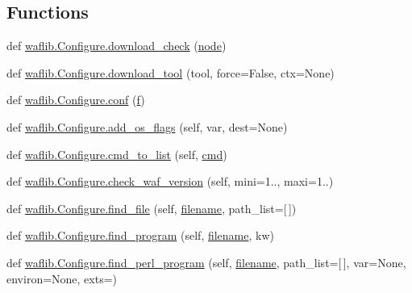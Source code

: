 \subsection*{Functions}
\begin{DoxyCompactItemize}
\item 
def \hyperlink{namespacewaflib_1_1_configure_a1e210b32a9fe3198b2a5d76f52b71217}{waflib.\+Configure.\+download\+\_\+check} (\hyperlink{structnode}{node})
\item 
def \hyperlink{namespacewaflib_1_1_configure_ad86a4a669e19d713f08512e871f3540a}{waflib.\+Configure.\+download\+\_\+tool} (tool, force=False, ctx=None)
\item 
def \hyperlink{namespacewaflib_1_1_configure_a41868904e34bb408566bcebd257f6a47}{waflib.\+Configure.\+conf} (\hyperlink{checksum_8c_ae747d72a1a803f5ff4a4b2602857d93b}{f})
\item 
def \hyperlink{namespacewaflib_1_1_configure_a8ab41e4f525735f1037b3f8af1136a04}{waflib.\+Configure.\+add\+\_\+os\+\_\+flags} (self, var, dest=None)
\item 
def \hyperlink{namespacewaflib_1_1_configure_ad63c4b95b4ee0e19c9277b62a01f4d08}{waflib.\+Configure.\+cmd\+\_\+to\+\_\+list} (self, \hyperlink{sndfile__play_8m_adfc5ba7e22f5e4a6221c12a70503bef3}{cmd})
\item 
def \hyperlink{namespacewaflib_1_1_configure_af4183e7207f75f765a04623d09d6f0f4}{waflib.\+Configure.\+check\+\_\+waf\+\_\+version} (self, mini=\textquotesingle{}1..\textquotesingle{}, maxi=\textquotesingle{}1..\textquotesingle{})
\item 
def \hyperlink{namespacewaflib_1_1_configure_a3d908ce526a31d68f9fe5868b1df9ab4}{waflib.\+Configure.\+find\+\_\+file} (self, \hyperlink{test__portburn_8cpp_a7efa5e9c7494c7d4586359300221aa5d}{filename}, path\+\_\+list=\mbox{[}$\,$\mbox{]})
\item 
def \hyperlink{namespacewaflib_1_1_configure_a3c03c8d378cab7e3288d087234c40190}{waflib.\+Configure.\+find\+\_\+program} (self, \hyperlink{test__portburn_8cpp_a7efa5e9c7494c7d4586359300221aa5d}{filename}, kw)
\item 
def \hyperlink{namespacewaflib_1_1_configure_a48a007e36c742a31bac966ce5d914814}{waflib.\+Configure.\+find\+\_\+perl\+\_\+program} (self, \hyperlink{test__portburn_8cpp_a7efa5e9c7494c7d4586359300221aa5d}{filename}, path\+\_\+list=\mbox{[}$\,$\mbox{]}, var=None, environ=None, exts=\textquotesingle{}\textquotesingle{})
\end{DoxyCompactItemize}
